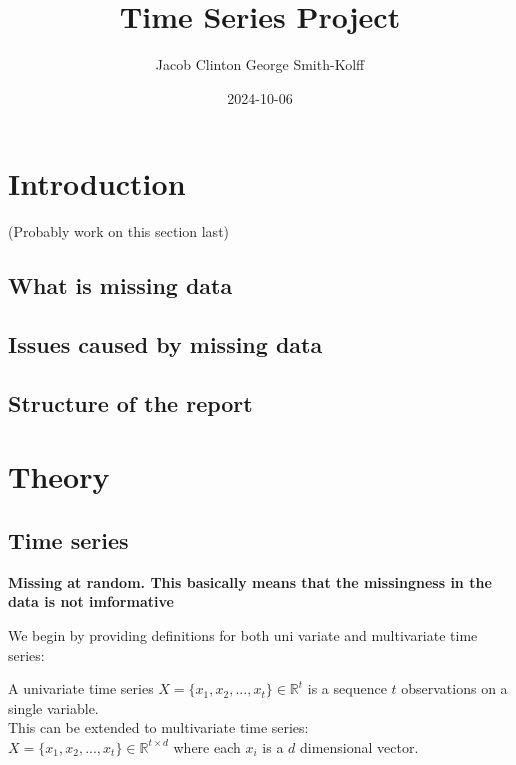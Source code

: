 \documentclass[
]{report}
\title{Time Series Project}
\author{Jacob Clinton George Smith-Kolff}
\date{2024-10-06}
\begin{document}
\maketitle

{
\setcounter{tocdepth}{1}
\tableofcontents
}
\hypertarget{introduction}{%
\chapter{Introduction}\label{introduction}}

(Probably work on this section last)

\hypertarget{what-is-missing-data}{%
\section{What is missing data}\label{what-is-missing-data}}

\hypertarget{issues-caused-by-missing-data}{%
\section{Issues caused by missing
data}\label{issues-caused-by-missing-data}}

\hypertarget{structure-of-the-report}{%
\section{Structure of the report}\label{structure-of-the-report}}

\hypertarget{theory}{%
\chapter{Theory}\label{theory}}

\hypertarget{time-series}{%
\section{Time series}\label{time-series}}

\textbf{Missing at random. This basically means that the missingness in the data is not imformative}

We begin by providing definitions for both uni variate and multivariate
time series:

A univariate time series \(X = \{x_1, x_2, ..., x_t\} \in \mathbb{R}^t\)
is a sequence \(t\) observations on a single variable.\\
This can be extended to multivariate time series:\\
\(X = \{x_1, x_2, ..., x_t\}\in \mathbb{R}^{t\times d}\) where each
\(x_i\) is a \(d\) dimensional vector.
\end{document}
